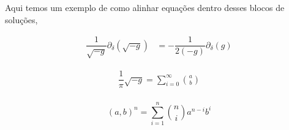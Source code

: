 \begin{solution}[I]
    Aqui temos um exemplo de como alinhar equações dentro desses blocos de soluções,

    \begin{align}
        \dfrac{1}{\sqrt{-g}}\partial_{\delta}(\sqrt{-g}) & = -\dfrac{1}{2(-g)}\partial_{\delta}(g) \label{eq: 2}
    \end{align}

    \begin{align}
        \dfrac{1}{\pi}{\sqrt{-g}} = \sum_{i=0}^{\infty} \binom{a}{b} \\
    \end{align}

    \begin{equation*}
        (a, b)^n = \sum_{i=1}^{n} \binom{n}{i} a^{n-i} b^i
    \end{equation*}
\end{solution}



